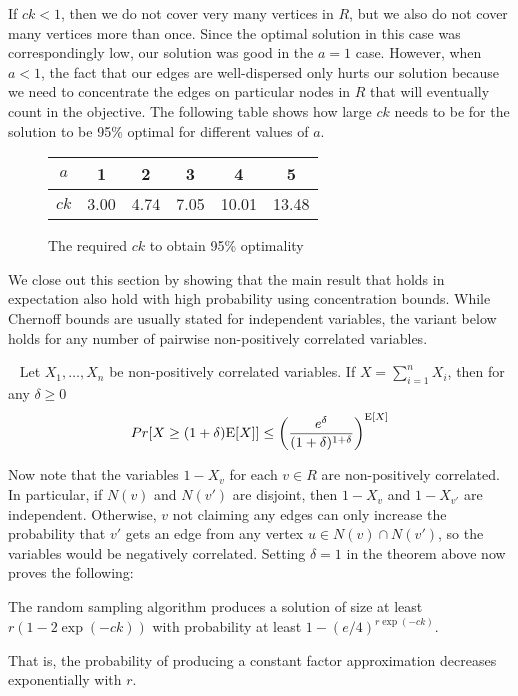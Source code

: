 If $ck<1$, then we do not cover very
many vertices in $R$, but we also do not cover many vertices more than
once. Since the optimal solution in this case was correspondingly low,
our solution was good in the $a=1$ case. However, when $a<1$, the fact
that our edges are well-dispersed only hurts our solution because we
need to concentrate the edges on particular nodes in $R$ that will eventually 
count in the objective. The following table shows how large $ck$ needs to be for the
solution to be 95\% optimal for different values of $a$.
\begin{figure}[h]
  \centering
  \begin{tabular}{ |c|c|c|c|c|c| }
    \hline
    $a$ & 1 & 2 & 3 & 4 & 5 \\ \hline
    $ck$ & 3.00 & 4.74 & 7.05 & 10.01 & 13.48 \\
    \hline
  \end{tabular}
  \caption{The required $ck$ to obtain 95\% optimality}
\end{figure} 

We close out this section by showing that the main result that holds in expectation also hold with high probability using concentration bounds. 
While Chernoff bounds are usually stated for independent variables, the
variant below holds for any number of pairwise non-positively correlated
variables.

\begin{thm}~\cite{}
Let $X_1,\ldots, X_n$ be non-positively correlated variables. If $X=\sum_{i=1}^n X_i$, then for any $\delta\geq 0$
\[ Pr[X \geq (1+\delta)\text{E}[X] ] \leq \left(\frac{e^\delta}{(1+\delta)^{1+\delta}}\right)^{\text{E}[X]} \]
\end{thm}

Now note that the variables $1-X_v$ for each $v\in R$ are
non-positively correlated. In particular, if $N(v)$ and $N(v')$ are
disjoint, then $1-X_v$ and $1-X_{v'}$ are independent. Otherwise, $v$
not claiming any edges can only increase the probability that $v'$
gets an edge from any vertex $u\in N(v)\cap N(v')$, so the variables
would be negatively correlated. Setting $\delta=1$ in the
theorem above now proves the following:

\begin{thm}
The random sampling algorithm produces a solution of size at least $r(1-2\exp(-ck))$ with probability at least $1-(e/4)^{r\exp(-ck)}$.
\end{thm}

That is, the probability of producing a constant factor approximation decreases exponentially with $r$.
